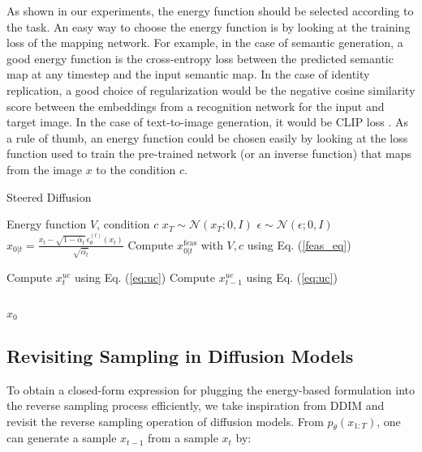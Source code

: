 \documentclass[10pt,twocolumn,letterpaper]{article}
\begin{document}
As shown in our experiments, the energy function should be selected according to the task. An easy way to choose the energy function is by looking at the training loss of the mapping network. For example, in the case of semantic generation, a good energy function is the cross-entropy loss between the predicted semantic map at any timestep and the input semantic map. In the case of identity replication, a good choice of regularization would be the negative cosine similarity score between the embeddings from a recognition network for the input and target image. In the case of text-to-image generation, it would be  CLIP loss \cite{radford2021learning}. As a rule of thumb, an energy function could be chosen easily by looking at the loss function used to train the pre-trained network (or an inverse function) that maps from the image $x$ to the condition $c$.

 
\begin{algorithm}
\caption{Steered Diffusion}
\label{ref:algo1}
\begin{algorithmic}[1]
\renewcommand{\algorithmicrequire}{\textbf{Input:}}
\renewcommand{\algorithmicensure}{\textbf{Initialize:}}
\Require Energy function $V$, condition $c$ 
\State $x_T \sim \mathcal{N}(x_T; 0,I)$
         \State $\epsilon \sim \mathcal{N}(\epsilon; 0,I)$
    \State     $ x_{0|t} =\frac{x_t - \sqrt{1 - \bar{\alpha}_t} \, \epsilon_\theta^{(t)}(x_t)}{\sqrt{\bar{\alpha_t}}}$
    \State Compute $ x_{0|t}^\mathrm{feas}$ with $V,c$ using Eq. (\ref{feas_eq})  

            \State  Compute $x_{t}^{uc}$ using Eq. (\ref{eq:uc})
        \Else
            \State  
            Compute $x_{t-1}^{uc}$ using Eq. (\ref{eq:uc})
        \EndIf
\EndFor
\EndFor

\\
\Return $x_0$
\end{algorithmic}
\label{test algo}
\end{algorithm}
\subsection{Revisiting Sampling in Diffusion Models}
To obtain a closed-form expression for plugging the energy-based formulation into the reverse sampling process efficiently, we take inspiration from DDIM\cite{song2020denoising} and revisit the reverse sampling operation of diffusion models. From $p_\theta(x_{1:T})$, one can generate a sample $x_{t-1}$ from a sample $x_{t}$ by:
\end{document}
